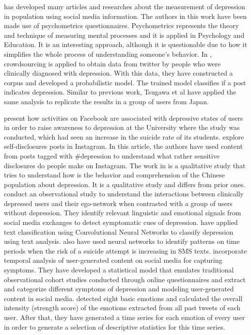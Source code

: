 \documentclass[11pt, notitlepage]{article} %
\begin{document}
\cite{DeChoudhury:2013:SMM:2464464.2464480} has developed many articles and researches about the measurement of depression in population using social media information. The authors in this work have been made use of psychometrics questionnaires. 
Psychometrics represents the theory and technique of measuring mental processes and it is applied in Psychology and Education. It is an interesting approach, although it is questionable due to how it simplifies the whole process of understanding someone's behavior.
In \cite{DeChoudhury:2013:SMM:2464464.2464480}, crowdsourcing is applied to obtain data from twitter by people who were clinically diagnosed with depression. With this data, they have constructed a corpus and developed a probabilistic model. The trained model classifies if a post indicates depression.
Similar to previous work, Tsugawa et al \cite{Tsugawa2015} have applied the same analysis to replicate the results in a group of users from Japan.

\cite{Park:2015:MDL:2675133.2675139} present how activities on Facebook are associated with depressive states of users in order to raise awareness to depression at the University where the study was conducted, which had seen an increase in the suicide rate of its students.
\cite{andalibi_sensitive_2017} explore self-disclosures posts in Instagram. In this article, the authors have used content from posts tagged with \#depression to understand what rather sensitive disclosures do people make on Instagram. The work in \cite{Li2016} is a qualitative study that tries to understand how is the behavior and comprehension of the Chinese population about depression. It is a qualitative study and differs from prior ones.
\cite{Vedula2017} conduct an observational study to understand the interactions between clinically depressed users and their ego-network when contrasted with a group of users without depression. They identify relevant linguistic and emotional signals from social media exchanges to detect symptomatic cues of depression.
\cite{Zhao:2018:TCM:3302425.3302501} have applied text classification using Convolutional Neural Networks to classify depression using text analysis. \cite{Nobles:2018:IIS:3173574.3173987} also have used neural networks to identify patterns on time periods when the risk of a suicide attempt is increasing in SMS texts.
\cite{Yazdavar:2017:SAM:3110025.3123028} incorporate temporal analysis of user-generated content on social media for capturing symptoms. They have developed a statistical model that emulates traditional observational cohort studies conducted through online questionnaires and extract and categorize different symptoms of depression and modeling user-generated content in social media.
\cite{Chen2018} detected eight basic emotions and calculated the overall intensity (strength score) of the emotions extracted from all past tweets of each user. After that, they have generated a time series for each emotion of every user in order to generate a selection of descriptive statistics for this time series.
\end{document}
